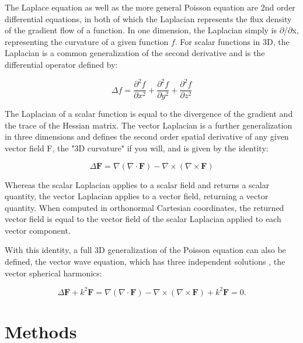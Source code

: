 \documentclass[twoside,final]{article}
\begin{document}
{The Laplace equation as well as the more general Poisson equation are 2nd order
differential equations, in both of which the Laplacian represents the flux
density of the gradient flow of a function. In one dimension, the Laplacian
simply is ${\partial}${\texttwosuperior}/${\partial}$x{\texttwosuperior},
representing the curvature of a given function $f$. For scalar functions in 3D,
the Laplacian is a common generalization of the second derivative and is the
differential operator defined by:

\begin{equation}
\Delta f = \frac{\partial ^2f}{\partial x^2}
         + \frac{\partial ^2f}{\partial y^2}
         + \frac{\partial ^2f}{\partial z^2}
\end{equation}

The Laplacian of a scalar function is equal to the divergence of the gradient
and the trace of the Hessian matrix. The vector Laplacian is a further
generalization in three dimensions and defines the second order spatial
derivative of any given vector field F, the "3D curvature" if you will, and is
given by the identity:

\begin{equation}
\Delta \boldsymbol{F}= \nabla (\nabla \cdot \boldsymbol{F})
                     - \nabla \times (\nabla \times \boldsymbol{F})
\end{equation}

Whereas the scalar Laplacian applies to a scalar field and returns a scalar
quantity, the vector Laplacian applies to a vector field, returning a vector
quantity. When computed in orthonormal Cartesian coordinates, the returned
vector field is equal to the vector field of the scalar Laplacian applied to
each vector component. 

With this identity, a full 3D generalization of the Poisson equation can also be
defined, the vector wave equation, which has three independent
solutions \cite{Stratton1941}, the vector spherical harmonics:

\begin{equation}\label{seq:refText3}
 \Delta \boldsymbol{F}  + k^2 \boldsymbol{F}
 = \nabla (\nabla \cdot \boldsymbol{F})  
 - \nabla \times (\nabla \times \boldsymbol{F})
 + k^2 \boldsymbol{F} = 0.
\end{equation}

\section{Methods}

}
\end{document}

